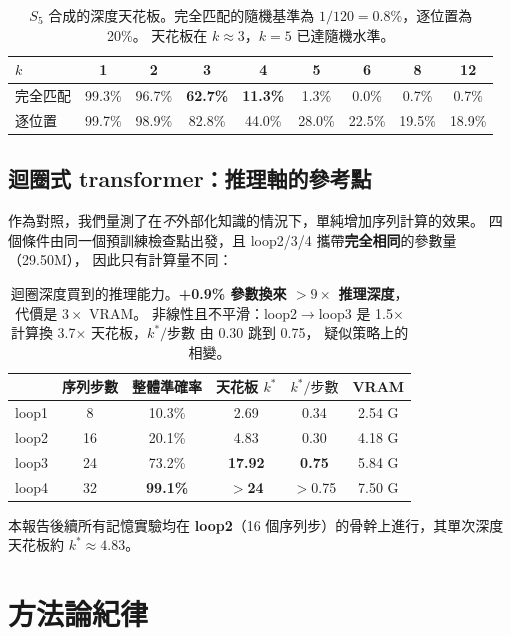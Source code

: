 \documentclass[11pt, a4paper]{article}
\begin{document}
\begin{table}[h]
\centering
\small
\begin{tabular}{lcccccccc}
\toprule
$k$ & 1 & 2 & 3 & 4 & 5 & 6 & 8 & 12 \\
\midrule
完全匹配 & 99.3\% & 96.7\% & \textbf{62.7\%} & \textbf{11.3\%} & 1.3\% & 0.0\% & 0.7\% & 0.7\% \\
逐位置 & 99.7\% & 98.9\% & 82.8\% & 44.0\% & 28.0\% & 22.5\% & 19.5\% & 18.9\% \\
\bottomrule
\end{tabular}
\caption{$S_5$ 合成的深度天花板。完全匹配的隨機基準為 $1/120 = 0.8\%$，逐位置為 20\%。
天花板在 $k \approx 3$，$k{=}5$ 已達隨機水準。}
\end{table}

\subsection{迴圈式 transformer：推理軸的參考點}

作為對照，我們量測了在\emph{不}外部化知識的情況下，單純增加序列計算的效果。
四個條件由同一個預訓練檢查點出發，且 loop2/3/4 攜帶\textbf{完全相同}的參數量（29.50M），
因此只有計算量不同：

\begin{table}[h]
\centering
\small
\begin{tabular}{lccccc}
\toprule
& 序列步數 & 整體準確率 & 天花板 $k^*$ & $k^*/\text{步數}$ & VRAM \\
\midrule
loop1 & 8 & 10.3\% & 2.69 & 0.34 & 2.54 G \\
loop2 & 16 & 20.1\% & 4.83 & 0.30 & 4.18 G \\
loop3 & 24 & 73.2\% & \textbf{17.92} & \textbf{0.75} & 5.84 G \\
loop4 & 32 & \textbf{99.1\%} & \textbf{$>$24} & $>$0.75 & 7.50 G \\
\bottomrule
\end{tabular}
\caption{迴圈深度買到的推理能力。\textbf{+0.9\% 參數換來 $>9\times$ 推理深度}，代價是 $3\times$ VRAM。
非線性且不平滑：loop2$\to$loop3 是 1.5$\times$ 計算換 3.7$\times$ 天花板，$k^*/$步數 由 0.30 跳到 0.75，
疑似策略上的相變。}
\end{table}

本報告後續所有記憶實驗均在 \textbf{loop2}（16 個序列步）的骨幹上進行，其單次深度天花板約 $k^* \approx 4.83$。

\section{方法論紀律}\label{sec:method}
\end{document}
